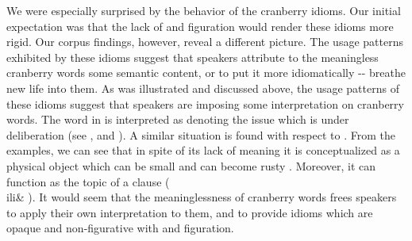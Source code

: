 \documentclass[output=paper]{langsci/langscibook}
\begin{document}
We\ili{} were\ili{} especially\ili{} surprised\ili{} by\ili{} the\ili{} behavior\ili{} of\ili{} the\ili{} cranberry\ili{} idioms\ili{}.\ili{} Our\ili{} initial\ili{} expectation\ili{} was\ili{} that\ili{} the\ili{} lack\ili{} of\ili{} \ili{}\isi{}\ili{} and\ili{} figuration\ili{} would\ili{} render\ili{} these\ili{} idioms\ili{} more\ili{} rigid\ili{}.\ili{} Our\ili{} corpus\ili{} findings\ili{},\ili{} however\ili{},\ili{} reveal\ili{} a\ili{} different\ili{} picture\ili{}.\ili{} The\ili{} usage\ili{} patterns\ili{} exhibited\ili{} by\ili{} these\ili{} idioms\ili{} suggest\ili{} that\ili{} speakers\ili{} attribute\ili{} to\ili{} the\ili{} meaningless\ili{} cranberry\ili{} words\ili{} some\ili{} semantic\ili{} content\ili{},\ili{} or\ili{} to\ili{} put\ili{} it\ili{} more\ili{} idiomatically\ili{} \ili{}-\ili{}-\ili{} breathe\ili{} new\ili{} life\ili{} into\ili{} them\ili{}.\ili{} As\ili{} was\ili{} illustrated\ili{} and\ili{} discussed\ili{} above\ili{},\ili{} the\ili{} usage\ili{} patterns\ili{} of\ili{} these\ili{} idioms\ili{} suggest\ili{} that\ili{} speakers\ili{} are\ili{} imposing\ili{} some\ili{} interpretation\ili{} on\ili{} cranberry\ili{} words\ili{}.\ili{} The\ili{} word\ili{} \ili{}\textnl{}\ili{} in\ili{} \ili{}\idgloss{}\ili{} is\ili{} interpreted\ili{} as\ili{} denoting\ili{} the\ili{} issue\ili{} which\ili{} is\ili{} under\ili{} deliberation\ili{} \ili{}(see\ili{} \ili{}\ili{},\ili{} \ili{}\ili{} and\ili{} \ili{}\ili{})\ili{}.\ili{} A\ili{} similar\ili{} situation\ili{} is\ili{} found\ili{} with\ili{} respect\ili{} to\ili{} \ili{}\textnl{}\ili{}.\ili{} From\ili{} the\ili{} examples\ili{},\ili{} we\ili{} can\ili{} see\ili{} that\ili{} in\ili{} spite\ili{} of\ili{} its\ili{} lack\ili{} of\ili{} meaning\ili{} it\ili{} is\ili{} conceptualized\ili{} as\ili{} a\ili{} physical\ili{} object\ili{} which\ili{} can\ili{} be\ili{} small\ili{} \ili{}\ili{} and\ili{} can\ili{} become\ili{} rusty\ili{} \ili{}\ili{}.\ili{} Moreover\ili{},\ili{} it\ili{} can\ili{} function\ili{} as\ili{} the\ili{} topic\ili{} of\ili{} a\ili{} clause\ili{} \ili{}(\ili{}\ili{} \ili{}\\ili{}&\ili{} \ili{}\ili{})\ili{}.\ili{} It\ili{} would\ili{} seem\ili{} that\ili{} the\ili{} meaninglessness\ili{} of\ili{} cranberry\ili{} words\ili{} frees\ili{} speakers\ili{} to\ili{} apply\ili{} their\ili{} own\ili{} interpretation\ili{} \ili{} to\ili{} them\ili{},\ili{} and\ili{} to\ili{} provide\ili{} idioms\ili{} which\ili{} are\ili{} opaque\ili{} and\ili{} non\ili{}-figurative\ili{} with\ili{} \ili{}\isi{}\ili{} and\ili{} figuration\ili{}.\ili{}
\end{document}
